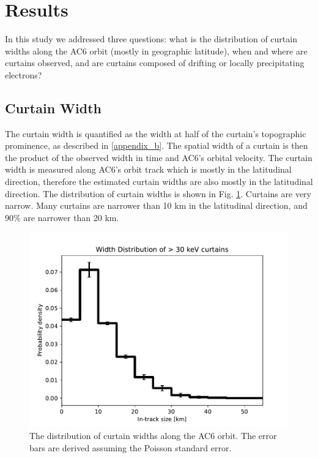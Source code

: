 \documentclass[draft]{agujournal2019}
\begin{document}
\section{Results} \label{results}
In this study we addressed three questions: what is the distribution of curtain widths along the AC6 orbit (mostly in geographic latitude), when and where are curtains observed, and are curtains composed of drifting or locally precipitating electrons?

\subsection{Curtain Width}
The curtain width is quantified as the width at half of the curtain's topographic prominence, as described in \ref{appendix_b}. The spatial width of a curtain is then the product of the observed width in time and AC6's orbital velocity. The curtain width is measured along AC6's orbit track which is mostly in the latitudinal direction, therefore the estimated curtain widths are also mostly in the latitudinal direction. The distribution of curtain widths is shown in Fig. \ref{width_dist}. Curtains are very narrow. Many curtains are narrower than 10 km in the latitudinal direction, and 90\% are narrower than 20 km.

\begin{figure}
\includegraphics[width=\textwidth]{fig2.pdf}
\caption{The distribution of curtain widths along the AC6 orbit. The error bars are derived assuming the Poisson standard error.}
\label{width_dist}
\end{figure}
\end{document}
